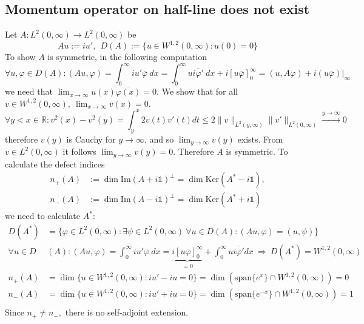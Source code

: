 \documentclass[12pt,a4paper]{article}
\newcommand\nm[1]{\lVert #1 \rVert}
\renewcommand\:{\colon}
\renewcommand{\Im}{\mathrm{Im}}
\newcommand{\Ker}{\mathrm{Ker}}
\newcommand{\Span}{\mathrm{span}}
\begin{document}
\subsection{Momentum operator on half-line does not exist}
Let $A\: L^{2}(0,\infty)\to L^{2}(0,\infty)$ be 
\begin{equation*}
	Au := iu', \ \ D(A):=\{u\in W^{1,2}(0,\infty)\: u(0)=0\}
\end{equation*}
To show $A$ is symmetric, in the following computation 
\begin{equation*}
	\forall u,\varphi\in D(A)\: (Au,\varphi) = \int_0^\infty iu'\overline{\varphi}\ dx = \int_0^\infty u\overline{i\varphi'}\ dx+i[u\overline{\varphi}]_0^\infty = (u,A\varphi)+i (u\overline{\varphi})\rvert_{\infty}
\end{equation*}
we need that $\displaystyle\lim_{x\to \infty} u(x)\overline{\varphi(x)}=0.$ We show that for all $v\in W^{1,2}(0,\infty),\ \displaystyle\lim_{x\to \infty}v(x)=0.$
\begin{equation*}
	\forall y<x\in \mathbb{R}\: v^{2}(x)-v^{2}(y)=\int_y^x 2v(t)v'(t)dt \leq 2\nm{v}_{L^{2}(y,\infty)}\nm{v'}_{L^{2}(0,\infty)}\stackrel{y\to \infty}{\to} 0
\end{equation*}
therefore $v(y)$ is Cauchy for $y\to \infty$, and so $\displaystyle\lim_{y\to \infty}v(y)$ exists. From $v\in L^{2}(0,\infty)$ it follows $\displaystyle\lim_{y\to \infty}v(y)=0.$ Therefore $A$ is symmetric.
To calculate the defect indices
\begin{align*}
	n_{+}(A)&:= \dim \Im(A+i \mathbb{1})^\perp=\dim \Ker(A^{*}-i \mathbb{1}),\\  n_{-}(A)&:= \dim \Im(A-i \mathbb{1})^\perp=\dim \Ker(A^{*}+i \mathbb{1})
\end{align*}
we need to calculate $A^{*}$:
\begin{align*}
	D(A^{*})&=\{\varphi\in L^{2}(0,\infty)\: \exists \psi\in L^{2}(0,\infty)\ \forall u\in D(A)\: (Au,\varphi)=(u,\psi)\} \\
	\forall u\in D&(A)\: (Au,\varphi)=\int_0^\infty iu'\overline{\varphi}\ dx = \underbrace{i[u\overline{\varphi}]_0^\infty}_{=0} + \int_0^\infty u\overline{i\varphi'}dx \ \Rightarrow \ D(A^{*})=W^{1,2}(0,\infty) \\
	n_+(A)&=\dim \{u\in W^{1,2}(0,\infty)\: iu'-iu=0\}=\dim (\Span\{e^{x}\}\cap W^{1,2}(0,\infty))=0 \\
	n_-(A)&=\dim \{u\in W^{1,2}(0,\infty)\: iu'+iu=0\}=\dim (\Span\{e^{-x}\}\cap W^{1,2}(0,\infty))=1 \\
\end{align*}
Since $n_+ \neq n_-,$ there is no self-adjoint extension.
\end{document}

